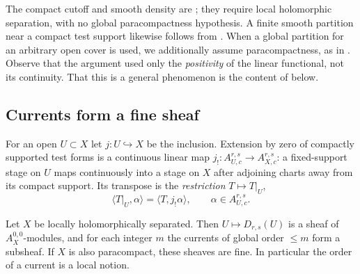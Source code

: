 The compact cutoff and smooth density are
\cite[Corollaries~15.2.5 and~15.2.7]{CLD25}; they require local holomorphic
separation, with no global paracompactness hypothesis. A finite smooth
partition near a compact test support likewise follows from
\cite[Corollary~15.2.9]{CLD25}. When a global partition for an arbitrary
open cover is used, we additionally assume paracompactness, as in
.  Observe that the argument used only
the \emph{positivity} of the linear functional, not its continuity.  That this
is a general phenomenon is the content of
 below.

\subsection{Currents form a fine sheaf}
\label{sec:ch14-sheaf}

For an open $U\subset X$ let $j:U\hookrightarrow X$ be the inclusion.
Extension by zero of compactly supported test forms is a continuous linear map
$j_!:A_{U,c}^{r,s}\to A_{X,c}^{r,s}$: a fixed-support stage on $U$ maps
continuously into a stage on $X$ after adjoining charts away from its compact
support.  Its transpose is the \emph{restriction} $T\mapsto T|_U$,
\[
 \langle T|_U,\alpha\rangle=\langle T,j_!\alpha\rangle,
 \qquad \alpha\in A_{U,c}^{r,s}.
\]

\begin{proposition}
\label{prop:ch14-currents-sheaf}
Let $X$ be locally holomorphically separated. Then
$U\mapsto D_{r,s}(U)$ is a sheaf of $A_X^{0,0}$-modules, and for each integer
$m$ the currents of global order $\le m$ form a subsheaf. If $X$ is also
paracompact, these sheaves are fine. In particular the order of a current
is a local notion.
\end{proposition}

